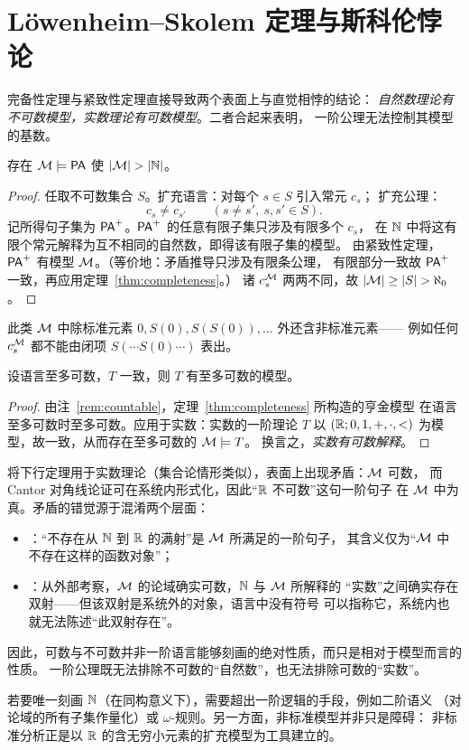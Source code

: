 \section{Löwenheim--Skolem 定理与斯科伦悖论}\label{sec:ls}

完备性定理与紧致性定理直接导致两个表面上与直觉相悖的结论：
\emph{自然数理论有不可数模型，实数理论有可数模型}。二者合起来表明，
一阶公理无法控制其模型的基数。

\begin{theorem}\label{thm:upward}
存在 $\mathcal{M}\models\mathsf{PA}$ 使 $|\M|>|\N|$。
\end{theorem}
\begin{proof}
任取不可数集合 $S$。扩充语言：对每个 $s\in S$ 引入常元 $c_s$；
扩充公理：
\[
  c_s\neq c_{s'}\qquad(s\neq s',\ s,s'\in S).
\]
记所得句子集为 $\mathsf{PA}^{+}$。$\mathsf{PA}^{+}$ 的任意有限子集只涉及有限多个 $c_s$，
在 $\mathbb{N}$ 中将这有限个常元解释为互不相同的自然数，即得该有限子集的模型。
由紧致性定理，$\mathsf{PA}^{+}$ 有模型 $\mathcal{M}$。（等价地：矛盾推导只涉及有限条公理，
有限部分一致故 $\mathsf{PA}^{+}$ 一致，再应用定理~\ref{thm:completeness}。）
诸 $c_s^{\mathcal{M}}$ 两两不同，故 $|\M|\ge|S|>\aleph_0$。
\end{proof}

此类 $\mathcal{M}$ 中除标准元素 $0,S(0),S(S(0)),\ldots$ 外还含非标准元素——
例如任何 $c_s^{\mathcal{M}}$ 都不能由闭项 $S(\cdots S(0)\cdots)$ 表出。

\begin{theorem}[下行：可数语言的一致理论有可数模型]\label{thm:downward}
设语言至多可数，$T$ 一致，则 $T$ 有至多可数的模型。
\end{theorem}
\begin{proof}
由注~\ref{rem:countable}，定理~\ref{thm:completeness} 所构造的亨金模型
在语言至多可数时至多可数。应用于实数：实数的一阶理论 $T$ 以
$(\mathbb{R};0,1,+,\cdot,<)$ 为模型，故一致，从而存在至多可数的 $\mathcal{M}\models T$。
换言之，\emph{实数有可数解释}。
\end{proof}

\begin{remark}[斯科伦悖论]
将下行定理用于实数理论（集合论情形类似），表面上出现矛盾：$\mathcal{M}$ 可数，
而 Cantor 对角线论证可在系统内形式化，因此“$\mathbb{R}$ 不可数”这句一阶句子
在 $\mathcal{M}$ 中为真。矛盾的错觉源于混淆两个层面：
\begin{itemize}[leftmargin=1.3em,itemsep=1pt]
  \item {}：“不存在从 $\mathbb{N}$ 到 $\mathbb{R}$ 的满射”是 $\mathcal{M}$ 所满足的一阶句子，
        其含义仅为“$\mathcal{M}$ 中不存在这样的函数对象”；
  \item {}：从外部考察，$\mathcal{M}$ 的论域确实可数，$\mathbb{N}$ 与 $\mathcal{M}$ 所解释的
        “实数”之间确实存在双射——但该双射是系统外的对象，语言中没有符号
        可以指称它，系统内也就无法陈述“此双射存在”。
\end{itemize}
因此，可数与不可数并非一阶语言能够刻画的绝对性质，而只是相对于模型而言的性质。
一阶公理既无法排除不可数的“自然数”，也无法排除可数的“实数”。
\end{remark}

\begin{remark}
若要唯一刻画 $\mathbb{N}$（在同构意义下），需要超出一阶逻辑的手段，例如二阶语义
（对论域的所有子集作量化）或 $\omega$-规则。另一方面，非标准模型并非只是障碍：
非标准分析正是以 $\mathbb{R}$ 的含无穷小元素的扩充模型为工具建立的。
\end{remark}
